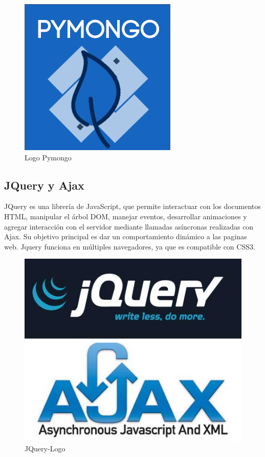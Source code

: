 \documentclass[a4paper,11pt]{book}
\begin{document}
\begin{figure}[H] 
\centering 
\includegraphics[scale=0.25]{imagenes/desarrollo_herramienta/pymongo.jpg}
\caption{ Logo Pymongo\cite{pymongoL}}  
\end{figure} 

 

\subsection{JQuery y Ajax}

JQuery\cite{jq} es una librería de JavaScript, que permite interactuar con los documentos HTML, manipular el árbol DOM, manejar eventos, desarrollar animaciones y agregar interacción con el servidor mediante llamadas asíncronas realizadas con Ajax. Su objetivo principal es dar un comportamiento dinámico a las paginas web. Jquery funciona en múltiples navegadores, ya que es compatible con CSS3.

\begin{figure}[H] 
\centering 
\includegraphics[scale=0.25]{imagenes/desarrollo_herramienta/ajax_jq.jpg}
\caption{ JQuery-Logo\cite{jq2}  }  
\end{figure}   
\end{document}

